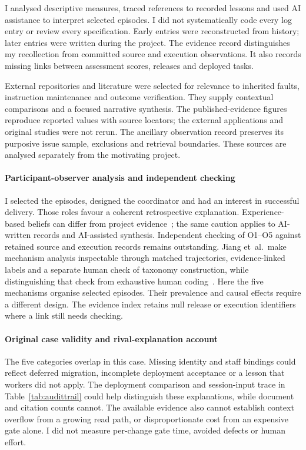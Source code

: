 I analysed descriptive measures, traced references to recorded lessons and
used AI assistance to interpret selected episodes. I did not systematically
code every log entry or review every specification. Early entries were
reconstructed from history; later entries were written during the project.
The evidence record distinguishes my recollection from committed source and
execution observations. It also records missing links between assessment
scores, releases and deployed tasks.

External repositories and literature were selected for relevance to
inherited faults, instruction maintenance and outcome verification.
They supply contextual comparisons and a focused narrative synthesis.
The published-evidence figures reproduce reported values with source
locators; the external applications and original studies were not rerun.
The ancillary observation record preserves its purposive issue sample,
exclusions and retrieval boundaries. These sources are analysed separately
from the motivating project.

\paragraph{Participant-observer analysis and independent checking}
I selected the episodes, designed the coordinator and had an interest in
successful delivery. Those roles favour a coherent retrospective
explanation. Experience-based beliefs can differ from project
evidence~\cite{devanbu2016belief}; the same caution applies to AI-written
records and AI-assisted synthesis. Independent checking of O1--O5 against
retained source and execution records remains outstanding.
Jiang et~al.\ make mechanism analysis inspectable through matched trajectories,
evidence-linked labels and a separate human check of taxonomy construction,
while distinguishing that check from exhaustive human coding~\cite[Sec.~4, App.~A.2]{jiang2026skills}.
Here the five mechanisms organise selected episodes.
Their prevalence and causal effects require a different
design. The evidence index retains null release or execution identifiers
where a link still needs checking.

\paragraph{Original case validity and rival-explanation account}


The five categories overlap in this case. Missing identity and staff
bindings could reflect deferred migration, incomplete deployment acceptance
or a lesson that workers did not apply. The deployment comparison and
session-input trace in Table~\ref{tab:audittrail} could help distinguish
these explanations, while document and citation counts cannot. The available
evidence also cannot establish context overflow from a growing read path, or
disproportionate cost from an expensive gate alone. I did not measure
per-change gate time, avoided defects or human effort.

